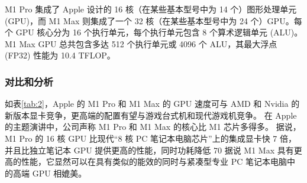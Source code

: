 \documentclass[a4paper]{article}
\begin{document}
M1 Pro 集成了 Apple 设计的 16 核（在某些基本型号中为 14 个）图形处理单元 (GPU)，而 M1 Max 则集成了一个 32 核（在某些基本型号中为 24 个）GPU。每个 GPU 核心分为 16 个执行单元，每个执行单元包含 8 个算术逻辑单元 (ALU)。 M1 Max GPU 总共包含多达 512 个执行单元或 4096 个 ALU，其最大浮点 (FP32) 性能为 10.4 TFLOP。

\subsubsection{对比和分析}

如表\ref{tab:2}，Apple 的 M1 Pro 和 M1 Max 的 GPU 速度可与 AMD 和 Nvidia 的新版本显卡竞争，更高端的配置有望与游戏台式机和现代游戏机竞争。
在 Apple 的主题演讲中，公司声称 M1 Pro 和 M1 Max 的核心比 M1 芯片多得多。 据说，M1 Pro 的 16 核 GPU 比现代“8 核 PC 笔记本电脑芯片”上的集成显卡快 7 倍，并且比独立笔记本 GPU 提供更高的性能，同时功耗降低 70%
据说 M1 Max 具有更高的性能，它显然可以在具有类似的能效的同时与紧凑型专业 PC 笔记本电脑中的高端 GPU 相媲美。
\end{document}
